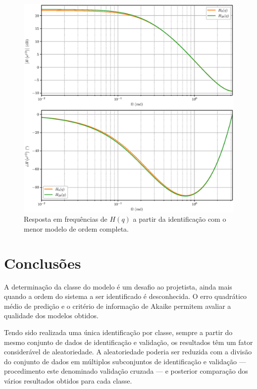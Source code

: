 \documentclass{ppgeesa}
\begin{document}
\begin{figure}[!htbp]
  \centering
  \includegraphics[width=\linewidth]{bode_H_28}
  \caption{Resposta em frequências de $H(q)$ a partir da identificação com o menor modelo de ordem completa.}
  \label{fig:bode-noise-complete}
\end{figure}

\section{Conclusões}

A determinação da classe do modelo é um desafio ao projetista, ainda mais quando a ordem do sistema a ser identificado é desconhecida.
O erro quadrático médio de predição e o critério de informação de Akaike permitem avaliar a qualidade dos modelos obtidos.

Tendo sido realizada uma única identificação por classe, sempre a partir do mesmo conjunto de dados de identificação e validação, os resultados têm um fator considerável de aleatoriedade.
A aleatoriedade poderia ser reduzida com a divisão do conjunto de dados em múltiplos subconjuntos de identificação e validação --- procedimento este denominado validação cruzada --- e posterior comparação dos vários resultados obtidos para cada classe.



\end{document}
